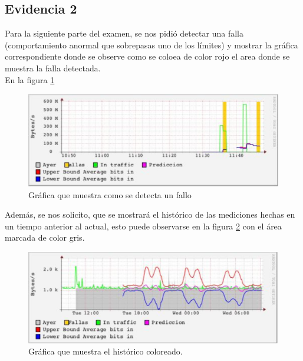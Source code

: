 \subsection{Evidencia 2}
Para la siguiente parte del examen, se nos pidió detectar una falla (comportamiento anormal que sobrepasas uno de los límites) y mostrar la gráfica correspondiente donde se observe como se coloea de color rojo el area donde se muestra la falla detectada.\\ En la figura \ref{img:1-3}
\begin{figure}[H]
  \centering
    \includegraphics[scale=.75]{imagenes/segundo/3.png}
    \caption{Gráfica que muestra como se detecta un fallo}
    \label{img:1-3}
\end{figure}
Además, se nos solicito, que se mostrará el histórico de las mediciones hechas en un tiempo anterior al actual, esto puede observarse en la figura \ref{img:1-4} con el área marcada de color gris.
\begin{figure}[H]
  \centering
    \includegraphics[scale=.75]{imagenes/segundo/4.png}
    \caption{Gráfica que muestra el histórico coloreado.}
    \label{img:1-4}
\end{figure}
